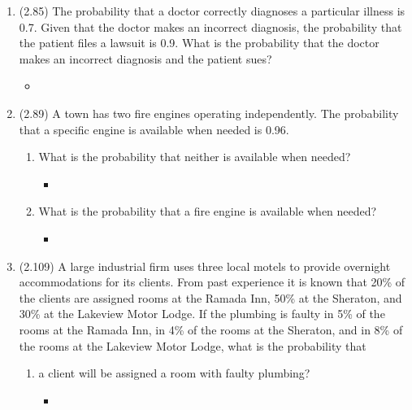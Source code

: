 \documentclass[basic, header]{nosvagor-notes}
\begin{document}
\begin{enumerate}[itemsep=7em]

  \item (2.85) The probability that a doctor correctly diagnoses a particular
    illness is 0.7. Given that the doctor makes an incorrect diagnosis, the
    probability that the patient files a lawsuit is 0.9. What is the probability that the doctor makes an incorrect diagnosis and
    the patient sues?
    \begin{itemize}
      \item

    \end{itemize}

  \item (2.89) A town has two fire engines operating independently. The
    probability that a specific engine is available when needed is 0.96.

    \begin{enumerate}

      \item What is the probability that neither is available when needed?
        \begin{itemize}
          \item

        \end{itemize}

      \item What is the probability that a fire engine is available when
        needed?
        \begin{itemize}
          \item

        \end{itemize}

    \end{enumerate}

  \item (2.109) A large industrial firm uses three local motels to provide
    overnight accommodations for its clients. From past experience it is known
    that 20\% of the clients are assigned rooms at the Ramada Inn, 50\% at the
    Sheraton, and 30\% at the Lakeview Motor Lodge. If the plumbing is faulty
    in 5\% of the rooms at the Ramada Inn, in 4\% of the rooms at the Sheraton,
    and in 8\% of the rooms at the Lakeview Motor Lodge, what is the
    probability that
    \begin{enumerate}

      \item a client will be assigned a room with faulty plumbing?
        \begin{itemize}
          \item


\end{itemize}
\end{enumerate}
\end{enumerate}
\end{document}
